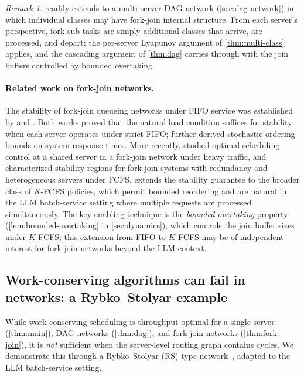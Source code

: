 \documentclass[11pt]{article}
\theoremstyle{plain}
\theoremstyle{definition}
\theoremstyle{remark}
\newtheorem{remark}[theorem]{Remark}
\begin{document}
\begin{remark}
 readily extends to a multi-server DAG network (\cref{sec:dag-network}) in which individual classes may have fork-join internal structure. From each server's perspective, fork sub-tasks are simply additional classes that arrive, are processed, and depart; the per-server Lyapunov argument of \cref{thm:multi-class} applies, and the cascading argument of \cref{thm:dag} carries through with the join buffers controlled by bounded overtaking.
\end{remark}

\paragraph{Related work on fork-join networks.}
The stability of fork-join queueing networks under FIFO service was established by \citet{konstantopoulos1989fork} and \citet{baccelli1989fork}. Both works proved that the natural load condition suffices for stability when each server operates under strict FIFO; \citet{baccelli1989fork} further derived stochastic ordering bounds on system response times. More recently, \citet{ozkan2016fork} studied optimal scheduling control at a shared server in a fork-join network under heavy traffic, and \citet{gao2025fork} characterized stability regions for fork-join systems with redundancy and heterogeneous servers under FCFS.  extends the stability guarantee to the broader class of $K$-FCFS policies, which permit bounded reordering and are natural in the LLM batch-service setting where multiple requests are processed simultaneously. The key enabling technique is the \emph{bounded overtaking} property (\cref{lem:bounded-overtaking} in \cref{sec:dynamics}), which controls the join buffer sizes under $K$-FCFS; this extension from FIFO to $K$-FCFS may be of independent interest for fork-join networks beyond the LLM context.

\subsection{Work-conserving algorithms can fail in networks: a Rybko--Stolyar example}
\label{sec:RS-network}

While work-conserving scheduling is throughput-optimal for a single server (\cref{thm:main}), DAG networks (\cref{thm:dag}), and fork-join networks (\cref{thm:fork-join}), it is \emph{not} sufficient when the server-level routing graph contains cycles. We demonstrate this through a Rybko--Stolyar (RS) type network~\citep{rybko1992ergodicity}, adapted to the LLM batch-service setting.
\end{document}
